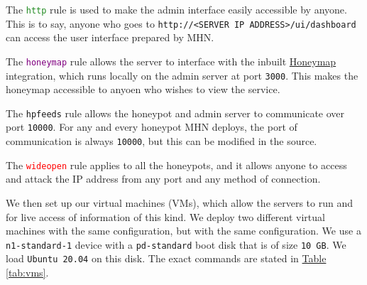 \documentclass[12pt,usenames,dvipsnames]{iopart}
\newcommand{\reftable}[1]{\hyperref[#1]{Table \ref*{#1}}}
\begin{document}
The \textcolor{ForestGreen}{\texttt{http}} rule is used to make the admin interface easily accessible by anyone. This is to say, anyone who goes to \texttt{http://<SERVER IP ADDRESS>/ui/dashboard} can access the user interface prepared by MHN. 

The \textcolor{Purple}{\texttt{honeymap}} rule allows the server to interface with the inbuilt \href{https://www.honeynet.org/2012/10/01/honeymap-visualizing-worldwide-attacks-in-real-time/}{Honeymap} integration, which runs locally on the admin server at port \texttt{3000}. This makes the honeymap accessible to anyoen who wishes to view the service.

The \textcolor{BurntOrange}{\texttt{hpfeeds}} rule allows the honeypot and admin server to communicate over port \texttt{10000}. For any and every honeypot MHN deploys, the port of communication is always \texttt{10000}, but this can be modified in the source.

The \textcolor{Red}{\texttt{wideopen}} rule applies to all the honeypots, and it allows anyone to access and attack the IP address from any port and any method of connection.


We then set up our virtual machines (VMs), which allow the servers to run and for live access of information of this kind. We deploy two different virtual machines with the same configuration, but with the same configuration. We use a \texttt{n1-standard-1} device with a \texttt{pd-standard} boot disk that is of size \texttt{10 GB}. We load \texttt{Ubuntu 20.04} on this disk. The exact commands are stated in \reftable{tab:vms}.
\end{document}
